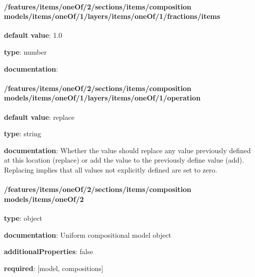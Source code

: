 \begin{itemized}
\paragraph{/features/items/oneOf/2/sections/items/composition models/items/oneOf/1/layers/items/oneOf/1/fractions/items} \begin{itemized}
\item {\bf default value}: 1.0
\item {\bf type}: number
\item {\bf documentation}: 
\end{itemized}\end{itemized}\paragraph{/features/items/oneOf/2/sections/items/composition models/items/oneOf/1/layers/items/oneOf/1/operation} \begin{itemized}
\item {\bf default value}: replace
\item {\bf type}: string
\item {\bf documentation}: Whether the value should replace any value previously defined at this location (replace) or add the value to the previously define value (add). Replacing implies that all values not explicitly defined are set to zero.
\end{itemized}\paragraph{/features/items/oneOf/2/sections/items/composition models/items/oneOf/2} \begin{itemized}
\item {\bf type}: object
\item {\bf documentation}: Uniform compositional model object
\item {\bf additionalProperties}: false
\item {\bf required}: [model, compositions]\end{itemized}
